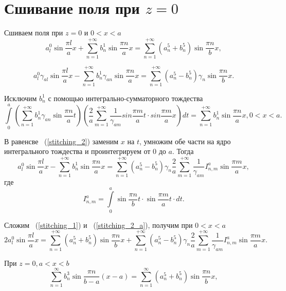 \section{Сшивание поля при $z=0$}

Сшиваем поля при $z = 0$ и $0 < x < a$
\begin{equation}
	\label{stitching_1}
	a_l^0\sin{\frac{\pi l}{a}x} + \sum\limits_{n=1}^{+\infty}b_n^1\sin{\frac{\pi n}{a}x} = \sum\limits_{n=1}^{+\infty}\left(a_n^5+b_n^5\right)\sin{\frac{\pi n}{b}x},
\end{equation}

\begin{equation}
	\label{stitching_2}
	a_l^0\gamma_{al}\sin{\frac{\pi l}{a}x} - \sum\limits_{n=1}^{+\infty}b_n^1\gamma_{an}\sin{\frac{\pi n}{a}x} = \sum\limits_{n=1}^{+\infty}\left(a_n^5-b_n^5\right)\gamma_{n}\sin{\frac{\pi n}{b}x}.
\end{equation}

Исключим $b_n^1$ с помощью интегрально-сумматорного тождества
$$
	\int\limits_0^a\left(\sum\limits_{n=1}^{+\infty}b_n^1\gamma_{an}\sin{\frac{\pi n}{a}t}\right)\left(\frac{2}{a}\sum\limits_{m=1}^{+\infty}\frac{1}{\gamma_{am}}sin{\frac{\pi m}{a}t} \cdot sin{\frac{\pi m}{a}x}\right)dt = \sum\limits_{n=1}^{+\infty}b_n^1\sin{\frac{\pi n}{a}x}, 0 < x < a.
$$

В равенсве ~(\ref{stitching_2}) заменим $x$ на $t$, умножим обе части на ядро интегрального тождества и проинтегрируем от $0$ до $a$. Тогда
\begin{equation}
	\label{stitching_2_a}
	a_l^0\sin{\frac{\pi l}{a}x}-\sum\limits_{n=1}^{+\infty}b_n^1\sin{\frac{\pi n}{a}x} = \sum\limits_{n=1}^{+\infty}\left(a_n^5-b_n^5\right)\gamma_{n}\frac{2}{a}\sum\limits_{m=1}^{+\infty}\frac{1}{\gamma_{am}}I_{n,m}^a\sin{\frac{\pi m}{a}x},
\end{equation}
где
$$
	I_{n,m}^a = \int\limits_0^a\sin{\frac{\pi n}{b}t} \cdot \sin{\frac{\pi m}{a}t} \cdot dt.
$$

Сложим ~(\ref{stitching_1}) и ~(\ref{stitching_2_a}), получим при $0 < x < a$
\begin{equation}
	\label{stitching_3}
	2a_l^0\sin{\frac{\pi l}{a}x} = \sum\limits_{n=1}^{+\infty}\left(a_n^5+b_n^5\right)\sin{\frac{\pi n}{b}x} + \sum\limits_{n=1}^{+\infty}\left(a_n^5-b_n^5\right)\gamma_{n}\frac{2}{a}\sum\limits_{m=1}^{+\infty}\frac{1}{\gamma_{am}}I_{n,m}^a\sin{\frac{\pi m}{a}x}.
\end{equation}

При $z = 0, a < x < b$
\begin{equation}
	\label{stitching_4}
	\sum\limits_{n=1}^{\infty}b_n^3\sin{\frac{\pi n}{b-a}(x-a)} = \sum\limits_{n=1}^{\infty}\left(a_n^5+b_n^5\right)\sin{\frac{\pi n}{b}x},	
\end{equation}

